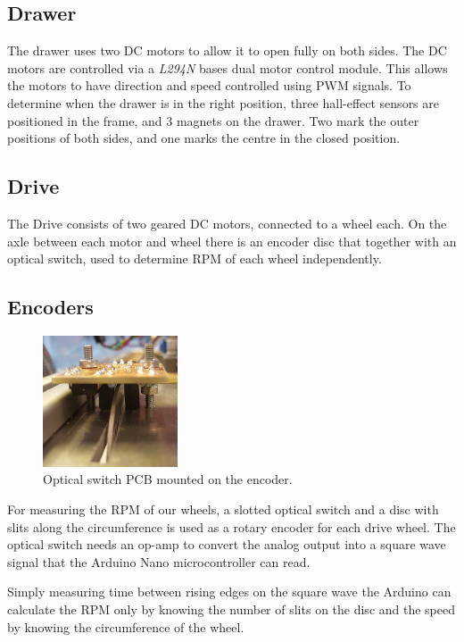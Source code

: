 \documentclass[11pt]{article}
\begin{document}
\subsection*{Drawer}
The drawer uses two DC motors to allow it to open fully on both sides. The DC motors are controlled via a \textit{L294N} bases dual motor control module. This allows the motors to have direction and speed controlled using PWM signals. To determine when the drawer is in the right position, three hall-effect sensors are positioned in the frame, and 3 magnets on the drawer. Two mark the outer positions of both sides, and one marks the centre in the closed position.

\subsection*{Drive}
The Drive consists of two geared DC motors, connected to a wheel each. On the axle between each motor and wheel there is an encoder disc that together with an optical switch, used to determine RPM of each wheel independently.

\subsection*{Encoders}
\begin{figure}
  \includegraphics[width=4cm]{mounted_encoder.jpg}
  \caption{Optical switch PCB mounted on the encoder.}
  \label{mounted-encoder}
\end{figure}


For measuring the RPM of our wheels, a slotted optical switch and a disc with slits along the circumference is used as a rotary encoder for each drive wheel. The optical switch needs an op-amp to convert the analog output into a square wave signal that the Arduino Nano microcontroller can read.


Simply measuring time between rising edges on the square wave the Arduino can calculate the RPM only by knowing the number of slits on the disc and the speed by knowing the circumference of the wheel.
\end{document}

